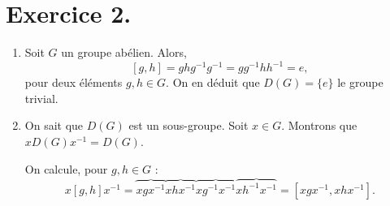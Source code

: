 \documentclass{../../td}
\begin{document}
  \chapter*{Exercice 2.}
  \begin{enumerate}
    \item Soit $G$ un groupe abélien. Alors, \[[g,h] = g h g^{-1} g^{-1} = g g^{-1} h h^{-1} = e,\] pour deux éléments $g, h \in G$.
      On en déduit que $D(G) = \{e\}$ le groupe trivial.
    \item On sait que $D(G)$ est un sous-groupe.
      Soit $x \in G$. Montrons que $x D(G) x^{-1} = D(G)$.

      On calcule, pour $g,h \in G$ :
      \[
        x [g,h] x^{-1} = \overbrace{x g x^{-1}} \overbrace{x h x^{-1}} \overbrace{x g^{-1} x^{-1}} \overbrace{x h^{-1} x^{-1}} = [x g x^{-1}, x h x^{-1}]
      .\]


\end{enumerate}
\end{document}
